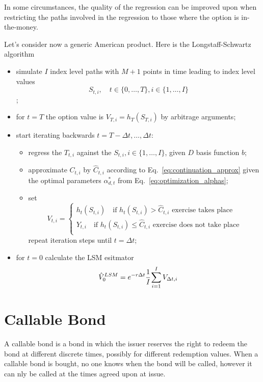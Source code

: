 \documentclass[12pt,a4paper]{book}
\begin{document}
In some circumstances, the quality of the regression can be improved upon when restricting the paths involved in the regression to those where the option is in-the-money.

Let's consider now a generic American product. Here is the Longstaff-Schwartz algorithm
\begin{itemize}
	\item simulate $I$ index level paths with $M+1$ points in time leading to index level values
	\begin{equation*}
		S_{t,i},\quad t \in \{0,\ldots,T\}, i \in \{1,\ldots,I\}
	\end{equation*};
	\item for $t=T$ the option value is $V_{T,i}=h_T(S_{T,i})$ by arbitrage arguments;
	\item start iterating backwards $t = T-\Delta t, \ldots,\Delta t$:
	\begin{itemize}
		\item regress the $T_{t,i}$ against the $S_{t,i}, i\in \{1,\ldots, I\}$, given $D$ basis function $b$;
		\item approximate $C_{t,i}$ by $\hat{C}_{t,i}$ according to Eq.~\ref{eq:continuation_approx} given the optimal parameters $\alpha^*_{d,t}$ from Eq.~\ref{eq:optimization_alphas};
		\item set 
		\begin{equation*}
			V_{t,i}=
			\begin{cases}
				h_t(S_{t,i})\quad\text{if }h_t(S_{t,i})>\hat{C}_{t,i}\text{ exercise takes place}\\
				Y_{t,i}\quad\text{if }h_t(S_{t,i})\leq\hat{C}_{t,i}\text{ exercise does not take place}\\
			\end{cases}
		\end{equation*}
		repeat iteration steps until $t=\Delta t$;
	\end{itemize} 
	\item for $t=0$ calculate the LSM esitmator
	\begin{equation}
		\hat{V}_0^{LSM}=e^{-r\Delta t}\cfrac{1}{I}\sum_{i=1}^{I}V_{\Delta t, i}
	\end{equation} 
\end{itemize}

\section{Callable Bond}
A callable bond is a bond in which the issuer reserves the right to redeem the bond at different discrete times, possibly for different redemption values. When a callable bond is bought, no one knows when the bond will be called, however it can nly be called at the times agreed upon at issue.
\end{document}
